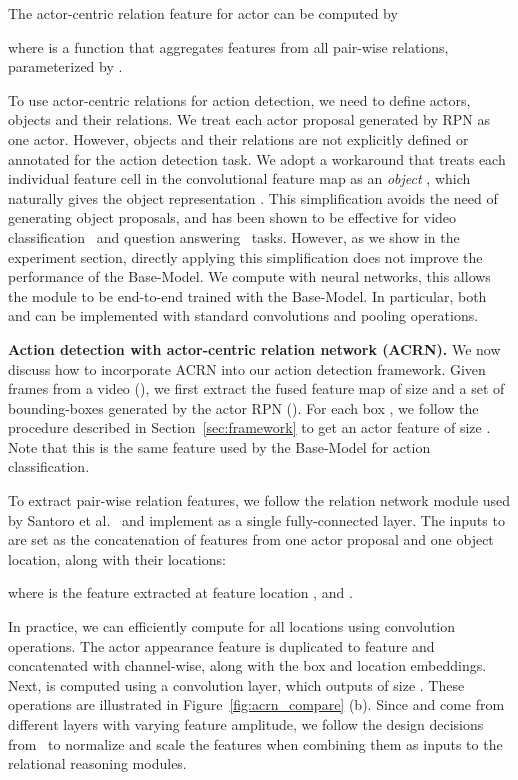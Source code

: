 \documentclass[runningheads]{llncs}
\begin{document}
The actor-centric relation feature for actor  can be computed by

where  is a function that aggregates features from all pair-wise relations, parameterized by .

To use actor-centric relations for action detection, we need to define actors, objects and their relations. We treat each actor proposal generated by RPN as one actor. However, objects and their relations are not explicitly defined or annotated for the action detection task. We adopt a workaround that treats each individual feature cell in the convolutional feature map  as an \textit{object} , which naturally gives the object representation . This simplification avoids the need of generating object proposals, and has been shown to be effective for video classification~\cite{non_local} and question answering~\cite{RN_deepmind17} tasks. However, as we show in the experiment section, directly applying this simplification does not improve the performance of the Base-Model. We compute  with neural networks, this allows the module to be end-to-end trained with the Base-Model. In particular, both  and  can be implemented with standard convolutions and pooling operations.

\medskip\noindent\textbf{Action detection with actor-centric relation network (ACRN).} We now discuss how to incorporate ACRN into our action detection framework. Given  frames from a video (), we first extract the fused feature map  of size  and a set of bounding-boxes generated by the actor RPN (). For each box , we follow the procedure described in Section~\ref{sec:framework} to get an actor feature  of size . Note that this is the same feature used by the Base-Model for action classification.

To extract pair-wise relation features, we follow the relation network module used by Santoro et al.~\cite{RN_deepmind17} and implement  as a single fully-connected layer. The inputs to  are set as the concatenation of features from one actor proposal and one object location, along with their locations:


where  is the  feature extracted at feature location , and .

In practice, we can efficiently compute  for all  locations using convolution operations. The actor appearance feature  is duplicated to  feature and concatenated with  channel-wise, along with the box and location embeddings. Next,  is computed using a  convolution layer, which outputs  of size . These operations are illustrated in Figure~\ref{fig:acrn_compare} (b). Since  and  come from different layers with varying feature amplitude, we follow the design decisions from~\cite{bell2016inside,parsenet,shrivastava2016contextual} to normalize and scale the features when combining them as inputs to the relational reasoning modules.
\end{document}
